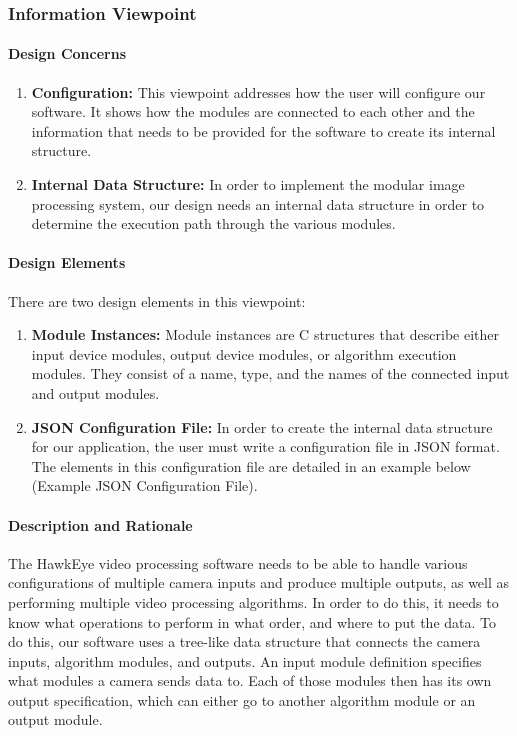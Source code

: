 \subsubsection{Information Viewpoint}
	\paragraph{Design Concerns}
	
	\begin{enumerate}[leftmargin=2cm,labelindent=2cm]
	\item \textbf{Configuration:}
	This viewpoint addresses how the user will configure our software. It shows how the modules are connected to each other and the information that 	needs to be provided for the software to create its internal structure.

	\item \textbf{Internal Data Structure:}
	In order to implement the modular image processing system, our design needs an internal data structure in order to determine the execution path 	through the various modules.\\
	\end{enumerate}
	
	\paragraph{Design Elements}
	There are two design elements in this viewpoint:\\
	\begin{enumerate}[leftmargin=2cm,labelindent=2cm]

	\item \textbf{Module Instances:}
	Module instances are C structures that describe either input device modules, output device modules, or algorithm execution modules. They 		consist of a name, type, and the names of the connected input and output modules.
	\item \textbf{JSON Configuration File:}
	In order to create the internal data structure for our application, the user must write a configuration file in JSON format. The elements in this 		configuration file are detailed in an example below (Example JSON Configuration File).\\
	\end{enumerate}
	
	\paragraph{Description and Rationale}
	The HawkEye video processing software needs to be able to handle various configurations of multiple camera inputs and produce multiple outputs, as well as performing multiple video processing algorithms. In order to do this, it needs to know what operations to perform in what order, and where to put the data. To do this, our software uses a tree-like data structure that connects the camera inputs, algorithm modules, and outputs. An input module definition specifies what modules a camera sends data to. Each of those modules then has its own output specification, which can either go to another algorithm module or an output module. \\
	
